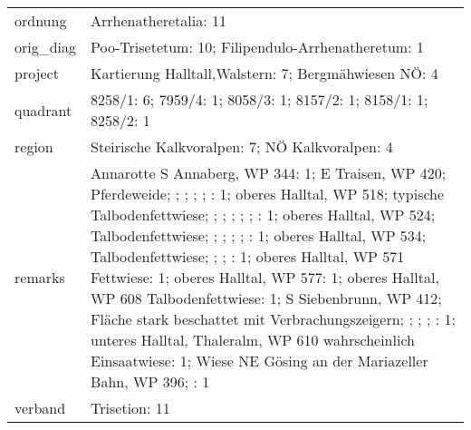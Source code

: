 \documentclass[9pt]{article}
\begin{document}
\begin{longtable}{lllllllllllllll}
ordnung& \multicolumn{14}{p{150mm}}{Arrhenatheretalia: 11}\tabularnewline
orig_diag& \multicolumn{14}{p{150mm}}{Poo-Trisetetum: 10; Filipendulo-Arrhenatheretum: 1}\tabularnewline
project& \multicolumn{14}{p{150mm}}{Kartierung Halltall,Walstern: 7; Bergmähwiesen NÖ: 4}\tabularnewline
quadrant& \multicolumn{14}{p{150mm}}{8258/1: 6; 7959/4: 1; 8058/3: 1; 8157/2: 1; 8158/1: 1; 8258/2: 1}\tabularnewline
region& \multicolumn{14}{p{150mm}}{Steirische Kalkvoralpen: 7; NÖ Kalkvoralpen: 4}\tabularnewline
remarks& \multicolumn{14}{p{150mm}}{Annarotte S Annaberg, WP 344: 1; E Traisen, WP 420; Pferdeweide; ; ; ; ; : 1; oberes Halltal, WP 518; typische Talbodenfettwiese; ; ; ; ; ; : 1; oberes Halltal, WP 524; Talbodenfettwiese; ; ; ; ; : 1; oberes Halltal, WP 534; Talbodenfettwiese; ; ; : 1; oberes Halltal, WP 571 Fettwiese: 1; oberes Halltal, WP 577: 1; oberes Halltal, WP 608 Talbodenfettwiese: 1; S Siebenbrunn, WP 412; Fläche stark beschattet mit Verbrachungszeigern; ; ; ; : 1; unteres Halltal, Thaleralm, WP 610 wahrscheinlich Einsaatwiese: 1; Wiese NE Gösing an der Mariazeller Bahn, WP 396; : 1}\tabularnewline
verband& \multicolumn{14}{p{150mm}}{Trisetion: 11}\tabularnewline
\bottomrule
\end{longtable}

\newpage
\end{document}

